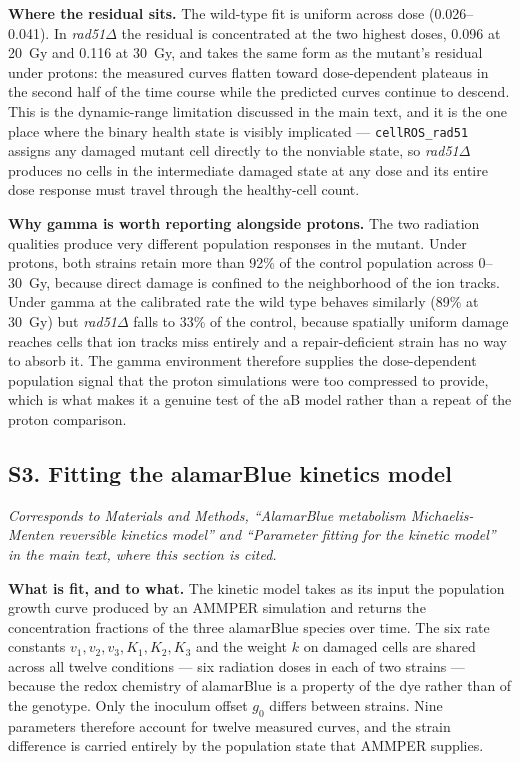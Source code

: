 \documentclass[11pt]{article}
\begin{document}
\textbf{Where the residual sits.} The wild-type fit is uniform across dose
(0.026--0.041). In \textit{rad51}$\Delta$ the residual is concentrated at the two
highest doses, 0.096 at 20~Gy and 0.116 at 30~Gy, and takes the same form as the
mutant's residual under protons: the measured curves flatten toward
dose-dependent plateaus in the second half of the time course while the predicted
curves continue to descend. This is the dynamic-range limitation discussed in the
main text, and it is the one place where the binary health state is visibly
implicated --- \texttt{cellROS\_rad51} assigns any damaged mutant cell directly to
the nonviable state, so \textit{rad51}$\Delta$ produces no cells in the
intermediate damaged state at any dose and its entire dose response must travel
through the healthy-cell count.

\textbf{Why gamma is worth reporting alongside protons.} The two radiation
qualities produce very different population responses in the mutant.
Under protons, both strains retain more than 92\% of the
control population across 0--30~Gy, because direct damage is confined to the
neighborhood of the ion tracks. Under gamma at the calibrated rate the wild type
behaves similarly (89\% at 30~Gy) but \textit{rad51}$\Delta$ falls to 33\% of the
control, because spatially uniform damage reaches cells that ion tracks miss
entirely and a repair-deficient strain has no way to absorb it. The gamma
environment therefore supplies the dose-dependent population signal that the
proton simulations were too compressed to provide, which is what makes it a
genuine test of the aB model rather than a repeat of the proton comparison.

\subsection{S3. Fitting the alamarBlue kinetics model}
\label{sec:ab-fitting}

\textit{Corresponds to Materials and Methods, ``AlamarBlue metabolism
Michaelis-Menten reversible kinetics model'' and ``Parameter fitting for the
kinetic model'' in the main text, where this section is cited.}

\textbf{What is fit, and to what.} The kinetic model takes as its input the
population growth curve produced by an AMMPER simulation and returns the
concentration fractions of the three alamarBlue species over time. The six rate
constants $v_1, v_2, v_3, K_1, K_2, K_3$ and the weight $k$ on damaged cells are
shared across all twelve conditions --- six radiation doses in each of two strains
--- because the redox chemistry of alamarBlue is a property of the dye rather than
of the genotype. Only the inoculum offset $g_0$ differs between strains. Nine
parameters therefore account for twelve measured curves, and the strain difference
is carried entirely by the population state that AMMPER supplies.
\end{document}
